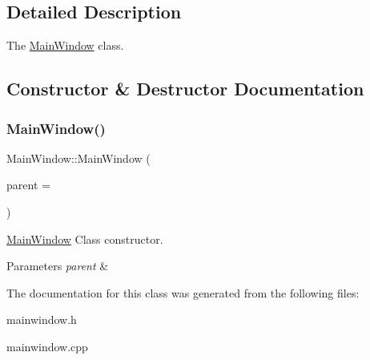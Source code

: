 \subsection{Detailed Description}
The \mbox{\hyperlink{class_main_window}{Main\+Window}} class. 

\subsection{Constructor \& Destructor Documentation}
\mbox{\label{class_main_window_a8b244be8b7b7db1b08de2a2acb9409db}} 
\subsubsection{\texorpdfstring{Main\+Window()}{MainWindow()}}
{\footnotesize\ttfamily Main\+Window\+::\+Main\+Window (\begin{DoxyParamCaption}\item[{Q\+Widget $\ast$}]{parent = {} }\end{DoxyParamCaption})\hspace{0.3cm}{\ttfamily [explicit]}}



\mbox{\hyperlink{class_main_window}{Main\+Window}} Class constructor. 


\begin{DoxyParams}{Parameters}
{\em parent} & \\
\hline
\end{DoxyParams}


The documentation for this class was generated from the following files\+:\begin{DoxyCompactItemize}
\item 
mainwindow.\+h\item 
mainwindow.\+cpp\end{DoxyCompactItemize}
